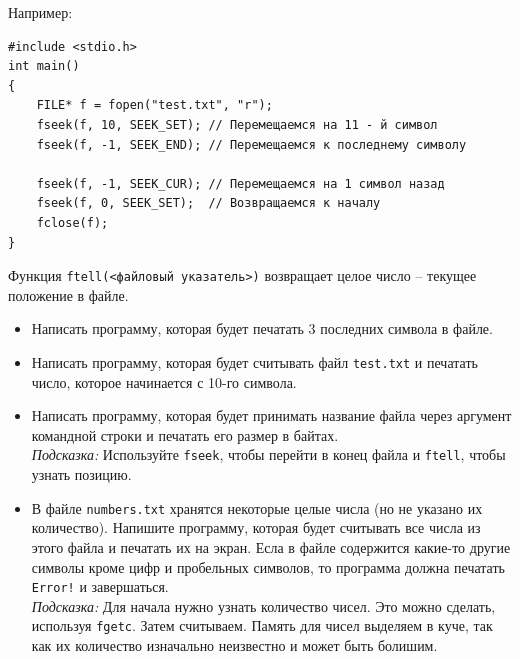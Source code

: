 \documentclass{article}
\begin{document}
Например:
\begin{lstlisting}
#include <stdio.h>
int main()
{
	FILE* f = fopen("test.txt", "r");
	fseek(f, 10, SEEK_SET); // Перемещаемся на 11 - й символ
	fseek(f, -1, SEEK_END); // Перемещаемся к последнему символу
	
	fseek(f, -1, SEEK_CUR); // Перемещаемся на 1 символ назад
	fseek(f, 0, SEEK_SET);  // Возвращаемся к началу
	fclose(f);
}

\end{lstlisting}

Функция \texttt{ftell(<файловый указатель>)} возвращает целое число -- текущее положение в файле.

\begin{itemize}
\item Написать программу, которая будет печатать 3 последних символа в файле.\\
\item Написать программу, которая будет считывать файл \texttt{test.txt} и печатать число, которое начинается с 10-го символа.
\item Написать программу, которая будет принимать название файла через аргумент командной строки и печатать его размер в байтах.\\
\textit{Подсказка:} Используйте \texttt{fseek}, чтобы перейти в конец файла и \texttt{ftell}, чтобы узнать позицию.

\item В файле \texttt{numbers.txt} хранятся некоторые целые числа (но не указано их количество). Напишите программу, которая будет считывать все числа из этого файла и печатать их на экран. Есла в файле содержится какие-то другие символы кроме цифр и пробельных символов, то программа должна печатать \texttt{Error!} и завершаться.\\
\textit{Подсказка:} Для начала нужно узнать количество чисел. Это можно сделать, используя \texttt{fgetc}. Затем считываем. Память для чисел выделяем в куче, так как их количество изначально неизвестно и может быть болишим.
\end{itemize}
\end{document}
